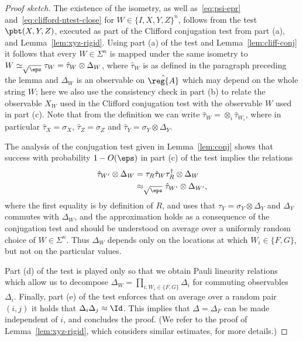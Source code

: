 \begin{proof}[Proof sketch]
The existence of the isometry, as well as~\eqref{eq:psi-epr} and~\eqref{eq:clifford-ntest-close} for $W \in \{I,X,Y,Z\}^{n}$, follows from the test $\pbt(X,Y,Z)$, executed as part of the Clifford conjugation test from part (a), and Lemma~\ref{lem:xyz-rigid}. 
Using part (a) of the test and Lemma~\ref{lem:cliff-conj} it follows that every $W \in \Sigma^n$ is mapped under the same isometry to $W \simeq_{\sqrt{\eps}} \tau_W = \hat{\tau}_W \otimes \Delta_W$, where $\hat{\tau}_W$ is as defined in the paragraph preceding the lemma  and  $\Delta_W$ is an observable on $\hat{\reg{A}}$ which may depend on the whole string $W$;  here we also use the consistency check in part (b) to relate  the observable $X_W$ used in the Clifford conjugation test with the observable $W$ used in part (c). Note that from the definition we can write $\hat{\tau}_W = \otimes_i \hat{\tau}_{W_i}$, where in particular $\hat{\tau}_X = \sigma_X$, $\hat{\tau}_Z = \sigma_Z$ and $\hat{\tau}_Y = \sigma_Y \otimes \Delta_Y$.

The analysis of the conjugation test given in Lemma~\ref{lem:conj} shows that success with probability $1-O(\eps)$ in part (c) of the test implies the relations 
\begin{align*}
 \hat{\tau}_{W'} \otimes \Delta_W &= \tau_R \hat{\tau}_W \tau_R^\dagger \otimes \Delta_W \\
&  \approx_{\sqrt{\eps}} \hat{\tau}_{W'} \otimes \Delta_{W'},
\end{align*}
where the first equality is by definition of $R$, and uses that $\tau_Y = \sigma_Y \otimes \Delta_Y$ and $\Delta_Y$ commutes with $\Delta_W$, and the approximation holds as a consequence of the conjugation test and should be understood on average over a uniformly random choice of $W\in \Sigma^n$. Thus $\Delta_W$ depends only on the locations at which $W_i \in \{F,G\}$, but not on the particular values. 

Part (d) of the test is played only so that we obtain Pauli linearity relations which allow us to decompose $\Delta_W = \prod_{i: W_i\in\{F,G\}} \Delta_i$ for commuting observables $\Delta_i$. Finally, part (e) of the test enforces that on average over a random pair $(i,j)$ it holds that $\Delta_i\Delta_j \approx \Id$. This implies that $\Delta = \Delta_F$ can be made independent of $i$, and concludes the proof. (We refer to the proof of Lemma~\ref{lem:xyz-rigid}, which considers similar estimates, for more details.)
\end{proof}


